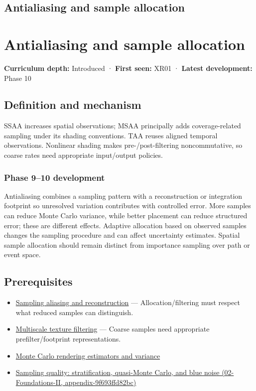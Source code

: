 \hypertarget{appendix-4192b2bdd21e}{}
\section*{Antialiasing and sample allocation}
\chapter{Antialiasing and sample allocation}\label{appendix-4192b2bdd21e-antialiasing-and-sample-allocation}

\textbf{Curriculum depth:} Introduced · \textbf{First seen:} XR01 · \textbf{Latest development:} Phase 10

\section{Definition and mechanism}\label{appendix-4192b2bdd21e-definition-and-mechanism}

SSAA increases spatial observations; MSAA principally adds coverage-related sampling under its shading conventions. TAA reuses aligned temporal observations. Nonlinear shading makes pre-/post-filtering noncommutative, so coarse rates need appropriate input/output policies.

\subsection{Phase 9--10 development}\label{appendix-4192b2bdd21e-phase-910-development}

Antialiasing combines a sampling pattern with a reconstruction or integration footprint so unresolved variation contributes with controlled error. More samples can reduce Monte Carlo variance, while better placement can reduce structured error; these are different effects. Adaptive allocation based on observed samples changes the sampling procedure and can affect uncertainty estimates. Spatial sample allocation should remain distinct from importance sampling over path or event space.

\section{Prerequisites}\label{appendix-4192b2bdd21e-prerequisites}

\begin{itemize}
\tightlist
\item
  \hyperref[appendix-6a7869dd79a6]{Sampling aliasing and reconstruction} --- Allocation/filtering must respect what reduced samples can distinguish.
\item
  \hyperref[appendix-b677a85ba76f]{Multiscale texture filtering} --- Coarse samples need appropriate prefilter/footprint representations.
\item
  \hyperref[appendix-031e02bf28af]{Monte Carlo rendering estimators and variance}
\item
  \href{../02-Foundations-II/main.pdf\#nameddest=appendix-9f693ffd82bc}{Sampling quality: stratification, quasi-Monte Carlo, and blue noise (02-Foundations-II, appendix-9f693ffd82bc)}
\end{itemize}

